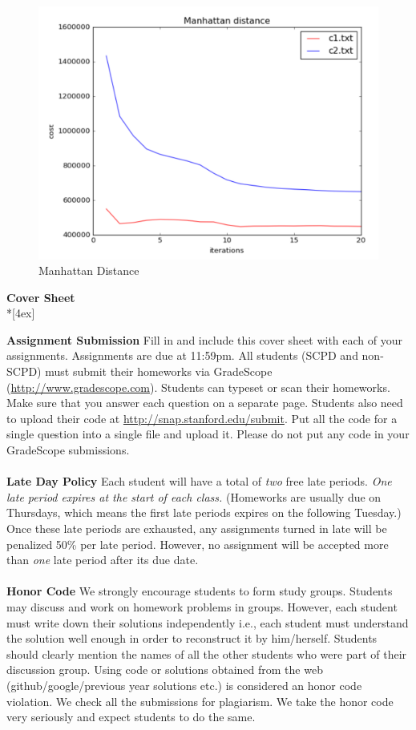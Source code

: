 \documentclass[11pt]{article}
\begin{document}
\begin{figure}[h]
\center
\includegraphics[scale=0.7]{Manhattan.png}
\caption{Manhattan Distance}
\end{figure}

\pagebreak[4]
\begin{center}
\LARGE{\bf \textsf{Cover Sheet}} \\*[4ex]
\end{center}

\textbf{Assignment Submission } Fill in and include this cover sheet with each of your assignments. Assignments are due at 11:59pm. All students (SCPD and non-SCPD) must submit their homeworks via GradeScope (\url{http://www.gradescope.com}). Students can typeset or scan their homeworks. Make sure that you answer each question on a separate page. Students also need to upload their code at \url{http://snap.stanford.edu/submit}. Put all the code for a single question into a single file and upload it. Please do not put any code in your GradeScope submissions. 
\\
\\
\textbf{Late Day Policy } Each student will have a total of {\em two} free late periods. {\em One late period expires at the start of each class.} (Homeworks are usually due on Thursdays, which means the first late periods expires on the following Tuesday.) Once these late periods are exhausted, any assignments turned in late will be penalized 50\% per late period. However, no assignment will be accepted more than {\em one} late period after its due date. 
\\
\\
\textbf{Honor Code } We strongly encourage students to form study groups. Students may discuss and work on homework problems in groups. However, each student must write down their solutions independently i.e., each student must understand the solution well enough in order to reconstruct it by him/herself.  Students should clearly mention the names of all the other students who were part of their discussion group. Using code or solutions obtained from the web (github/google/previous year solutions etc.) is considered an honor code violation. We check all the submissions for plagiarism. We take the honor code very seriously and expect students to do the same. 
\end{document}
